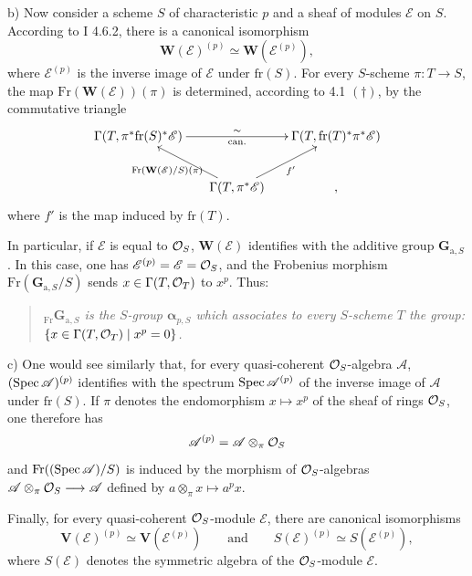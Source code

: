 \noindent b) Now consider a scheme $S$ of characteristic $p$ and a sheaf of modules $\mathscr E$ on $S$. According to I 4.6.2, there is a canonical isomorphism
\[
\mathbf W(\mathscr E)^{(p)}\simeq\mathbf W(\mathscr E^{(p)}),
\]
where $\mathscr E^{(p)}$ is the inverse image of $\mathscr E$ under $\mathrm{fr}(S)$. For every $S$-scheme $\pi:T\to S$, the map $\mathrm{Fr}(\mathbf W(\mathscr E))(\pi)$ is determined, according to 4.1 $(\dagger)$, by the commutative triangle
\[
\xymatrix@C=1.5em{\Gamma(T,\pi^*\mathrm{fr}(S)^*\mathscr E)\ar[rr]^\sim_{\mathrm{can.}}&&\Gamma(T,\mathrm{fr}(T)^*\pi^*\mathscr E)\\
&\Gamma(T,\pi^*\mathscr E)\ar[ul]^{\mathrm{Fr}(\mathbf W(\mathscr E)/S)(\pi)}\ar[ur]_{f'}&,}
\]
where $f'$ is the map induced by $\mathrm{fr}(T)$.

In particular, if $\mathscr E$ is equal to $\mathcal{O}_S$, $\mathbf W(\mathscr E)$ identifies with the additive group $\mathbf G_{\mathrm a,S}$. In this case, one has $\mathscr E^{(p)}=\mathscr E=\mathcal{O}_S$, and the Frobenius morphism $\mathrm{Fr}(\mathbf G_{\mathrm a,S}/S)$ sends $x\in\Gamma(T,\mathcal{O}_T)$ to $x^p$. Thus:
\begin{quote}\emph{${}_{\mathrm{Fr}}\mathbf G_{\mathrm a,S}$ is the $S$-group $\boldsymbol\alpha_{p,S}$ which associates to every $S$-scheme $T$ the group: $\{x\in\Gamma(T,\mathcal{O}_T)\mid x^p=0\}$.}\end{quote}

\noindent c) One would see similarly that, for every quasi-coherent $\mathcal{O}_S$-algebra $\mathscr A$, $(\operatorname{Spec}\mathscr A)^{(p)}$ identifies with the spectrum $\operatorname{Spec}\mathscr A^{(p)}$ of the inverse image of $\mathscr A$ under $\mathrm{fr}(S)$. If $\pi$ denotes the endomorphism $x\mapsto x^p$ of the sheaf of rings $\mathcal{O}_S$, one therefore has
\[
\mathscr A^{(p)}=\mathscr A\otimes_\pi\mathcal{O}_S
\]
and $\mathrm{Fr}((\operatorname{Spec}\mathscr A)/S)$ is induced by the morphism of $\mathcal{O}_S$-algebras $\mathscr A\otimes_\pi\mathcal{O}_S\longrightarrow\mathscr A$ defined by $a\otimes_\pi x\mapsto a^px$.

Finally, for every quasi-coherent $\mathcal{O}_S$-module $\mathscr E$, there are canonical isomorphisms
\[
\mathbf V(\mathscr E)^{(p)}\simeq\mathbf V(\mathscr E^{(p)})\qquad\text{and}\qquad S(\mathscr E)^{(p)}\simeq S(\mathscr E^{(p)}),
\]
where $S(\mathscr E)$ denotes the symmetric algebra of the $\mathcal{O}_S$-module $\mathscr E$.

